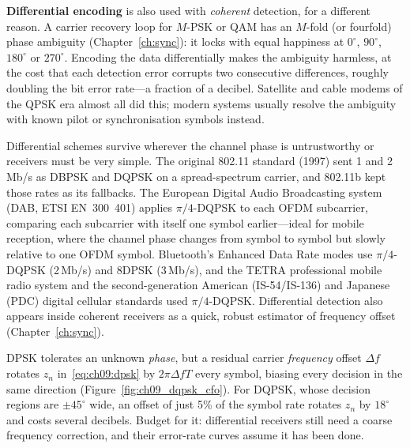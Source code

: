 
\textbf{Differential encoding} is also used with \emph{coherent}
detection, for a different reason. A carrier recovery loop for $M$-PSK or QAM has an $M$-fold (or
fourfold) phase ambiguity (Chapter~\ref{ch:sync}): it locks with equal happiness at $0^\circ$,
$90^\circ$, $180^\circ$ or $270^\circ$. Encoding the data differentially makes the ambiguity
harmless, at the cost that each detection error corrupts two consecutive differences, roughly
doubling the bit error rate---a fraction of a decibel. Satellite and cable modems of the QPSK era
almost all did this; modern systems usually resolve the ambiguity with known pilot or
synchronisation symbols instead.

\begin{inpractice}
Differential schemes survive wherever the channel phase is untrustworthy or receivers must be
very simple. The original 802.11 standard (1997) sent 1 and 2\,Mb/s as DBPSK and DQPSK on a
spread-spectrum carrier, and 802.11b kept those rates as its fallbacks. The European Digital
Audio Broadcasting system (DAB, ETSI EN~300~401) applies $\pi/4$-DQPSK to each OFDM subcarrier,
comparing each subcarrier with itself one symbol earlier---ideal for mobile reception, where the
channel phase changes from symbol to symbol but slowly relative to one OFDM symbol. Bluetooth's
Enhanced Data Rate modes use $\pi/4$-DQPSK (2\,Mb/s) and 8DPSK (3\,Mb/s), and the TETRA
professional mobile radio system and the second-generation American (IS-54/IS-136) and Japanese
(PDC) digital cellular standards used $\pi/4$-DQPSK. Differential detection also appears inside
coherent receivers as a quick, robust estimator of frequency offset (Chapter~\ref{ch:sync}).
\end{inpractice}

\begin{pitfall}
DPSK tolerates an unknown \emph{phase}, but a residual carrier \emph{frequency} offset $\Delta f$
rotates $z_n$ in~\eqref{eq:ch09:dpsk} by $2\pi\Delta fT$ every symbol, biasing every decision in
the same direction (Figure~\ref{fig:ch09_dqpsk_cfo}). For DQPSK, whose decision regions are
$\pm45^\circ$ wide, an offset of just 5\% of the symbol rate rotates $z_n$ by $18^\circ$ and costs
several decibels. Budget for it: differential receivers still need a coarse frequency correction,
and their error-rate curves assume it has been done.
\end{pitfall}

